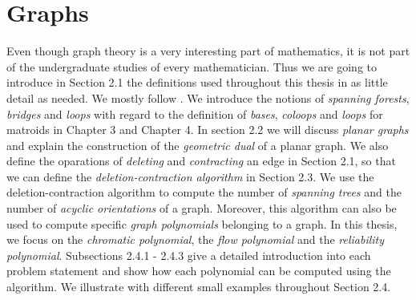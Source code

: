 \documentclass[12pt,a4paper, twoside, autooneside=false]{scrartcl}
\theoremstyle{definition}
\theoremstyle{remark}
\numberwithin{equation}{section}
\begin{document}
\section{Graphs}
Even though graph theory is a very interesting part of mathematics, it is not part of the undergraduate studies of every mathematician. Thus we are going to introduce in Section 2.1 the definitions used throughout this thesis in as little detail as needed. We mostly follow \cite{GoRo2001}. We introduce the notions of \textit{spanning forests}, \textit{bridges} and \textit{loops} with regard to the definition of \textit{bases}, \textit{coloops} and \textit{loops} for matroids in Chapter 3 and Chapter 4. In section 2.2 we will discuss \textit{planar graphs} and explain the construction of the \textit{geometric dual} of a planar graph. We also define the oparations of \textit{deleting} and \textit{contracting} an edge in Section 2.1, so that we can define the \textit{deletion-contraction algorithm} in Section 2.3. We use the deletion-contraction algorithm to compute the number of \textit{spanning trees} and the number of \textit{acyclic orientations} of a graph. Moreover, this algorithm can also be used to compute specific \textit{graph polynomials} belonging to a graph. In this thesis, we focus on the \textit{chromatic polynomial}, the \textit{flow polynomial} and the \textit{reliability polynomial}. Subsections 2.4.1 - 2.4.3 give a detailed introduction into each problem statement and show how each polynomial can be computed using the algorithm. We illustrate with different small examples throughout Section 2.4.
\end{document}
